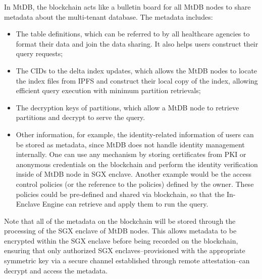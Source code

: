 \documentclass[conference]{IEEEtran}
\newcommand{\showkot}[1]{ {\color{red}{#1}}}
\newcommand{\wenyi}[1]{ {\color{blue}{#1}}}
\newcommand{\seokki}[1]{ {\color{orange}{#1}}}
\newcommand{\ours}{\xspace MtDB\xspace}
\begin{document}
In \ours, 
the blockchain acts like a bulletin board for all \ours nodes to share metadata about the multi-tenant database. 
The metadata includes: 
\begin{itemize}
    \item The table definitions, which can be referred to by all healthcare agencies to format their data and join the data sharing. It also helps users construct their query requests;
    \item The CIDs to the delta index updates, which allows the \ours nodes to locate the index files from IPFS and construct their local copy of the index, allowing efficient query execution with minimum partition retrievals;
    \item The decryption keys of partitions, which allow a \ours node to retrieve partitions and decrypt to serve the query.
    \item Other information, for example, the identity-related information of users can be stored as metadata, since \ours does not handle identity management internally. One can use any mechanism by storing certificates from PKI or anonymous credentials \cite{rosenberg2023zk} on the blockchain and perform the identity verification inside of \ours node in SGX enclave.
    Another example would be the access control policies (or the reference to the policies) defined by the owner. These policies could be pre-defined and shared via blockchain, so that the In-Enclave Engine can retrieve and apply them to run the query.
\end{itemize}
Note that all of the metadata on the blockchain will be stored through the processing of the SGX enclave of \ours nodes. 
This allows metadata to be encrypted within the SGX enclave before being recorded on the blockchain, ensuring that only authorized SGX enclaves--provisioned with the appropriate symmetric key via a secure channel established through remote attestation--can decrypt and access the metadata.
\end{document}
